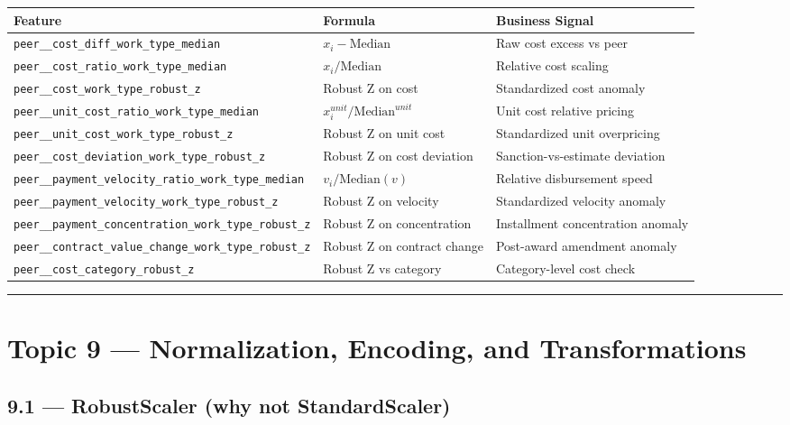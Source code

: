 \documentclass[11pt,a4paper]{article}
\begin{document}
\begin{table}[htbp]
\centering
\small
\begin{tabularx}{\textwidth}{l l Y}
\toprule
\textbf{Feature} & \textbf{Formula} & \textbf{Business Signal} \\
\midrule
\texttt{peer\_\_cost\_diff\_work\_type\_median} & $x_i - \text{Median}$ & Raw cost excess vs peer \\
\texttt{peer\_\_cost\_ratio\_work\_type\_median} & $x_i / \text{Median}$ & Relative cost scaling \\
\texttt{peer\_\_cost\_work\_type\_robust\_z} & Robust Z on cost & Standardized cost anomaly \\
\texttt{peer\_\_unit\_cost\_ratio\_work\_type\_median} & $x_i^{unit} / \text{Median}^{unit}$ & Unit cost relative pricing \\
\texttt{peer\_\_unit\_cost\_work\_type\_robust\_z} & Robust Z on unit cost & Standardized unit overpricing \\
\texttt{peer\_\_cost\_deviation\_work\_type\_robust\_z} & Robust Z on cost deviation & Sanction-vs-estimate deviation \\
\texttt{peer\_\_payment\_velocity\_ratio\_work\_type\_median} & $v_i / \text{Median}(v)$ & Relative disbursement speed \\
\texttt{peer\_\_payment\_velocity\_work\_type\_robust\_z} & Robust Z on velocity & Standardized velocity anomaly \\
\texttt{peer\_\_payment\_concentration\_work\_type\_robust\_z} & Robust Z on concentration & Installment concentration anomaly \\
\texttt{peer\_\_contract\_value\_change\_work\_type\_robust\_z} & Robust Z on contract change & Post-award amendment anomaly \\
\texttt{peer\_\_cost\_category\_robust\_z} & Robust Z vs category & Category-level cost check \\
\bottomrule
\end{tabularx}
\end{table}


\vspace{1em}\hrule\vspace{1em}

\section{Topic 9 --- Normalization, Encoding, and Transformations}

\subsection{9.1 --- RobustScaler (why not StandardScaler)}
\end{document}
